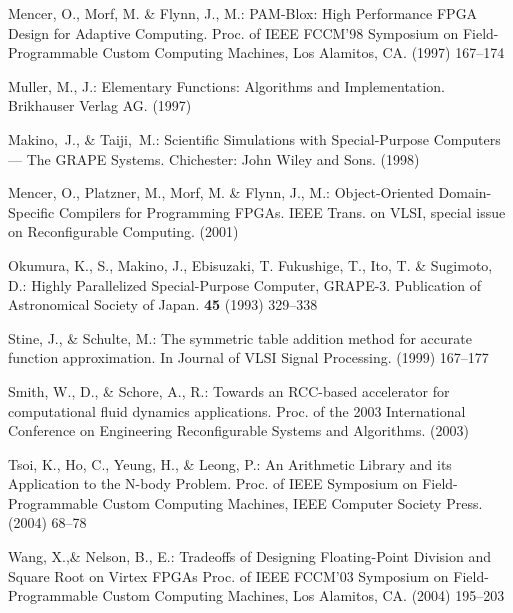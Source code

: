 \documentclass{llncs}
\begin{document}
\begin{thebibliography}{}

Mencer, O., Morf, M. \& Flynn, J., M.:
PAM-Blox: High Performance FPGA Design for Adaptive Computing.
Proc. of IEEE FCCM'98 Symposium on Field-Programmable Custom Computing Machines, Los Alamitos, CA.
(1997) 167--174

Muller, M., J.:
Elementary Functions: Algorithms and Implementation.
Brikhauser Verlag AG.
(1997)


Makino,~J., \& Taiji,~M.:
Scientific Simulations with Special-Purpose Computers --- The GRAPE Systems.
Chichester: John Wiley and Sons.
(1998)

Mencer, O., Platzner, M., Morf, M. \& Flynn, J., M.:
Object-Oriented Domain-Specific Compilers for Programming FPGAs.
IEEE Trans. on VLSI, special issue on Reconfigurable Computing.
(2001)


Okumura, K., S., Makino, J., Ebisuzaki, T. Fukushige, T., Ito, T. \& Sugimoto, D.:
Highly Parallelized Special-Purpose Computer, GRAPE-3.
Publication of Astronomical Society of Japan.
{\bfseries 45} (1993) 329--338


Stine, J., \& Schulte, M.:
The symmetric table addition method for accurate function approximation.
In Journal of VLSI Signal Processing.
(1999) 167--177

Smith, W., D., \& Schore, A., R.:
Towards an RCC-based accelerator for computational fluid dynamics applications.
Proc. of the 2003 International Conference on Engineering Reconfigurable Systems and Algorithms.
(2003)

Tsoi, K., Ho, C., Yeung, H., \& Leong, P.:
An Arithmetic Library and its Application to the N-body Problem.
Proc. of IEEE Symposium on Field-Programmable Custom Computing Machines, IEEE Computer Society Press.
(2004) 68--78

Wang, X.,\& Nelson, B., E.:
Tradeoffs of Designing Floating-Point Division and Square Root on Virtex FPGAs
Proc. of IEEE FCCM'03 Symposium on Field-Programmable Custom Computing Machines, Los Alamitos, CA.
(2004) 195--203


\end{thebibliography}
\end{document}
